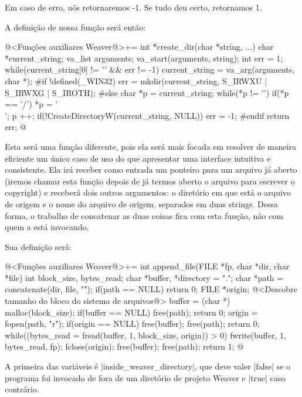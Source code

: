{Em caso de erro, nós retornaremos -1. Se tudo deu certo, retornamos 1.

A definição de nossa função será então:

\iniciocodigo
@<Funções auxiliares Weaver@>+=
int *create_dir(char *string, ...){
  char *current_string;
  va_list arguments;
  va_start(arguments, string);
  int err = 1;
  while(current_string[0] != '\0' && err != -1){
    current_string = va_arg(arguments, char *);
#if !defined(_WIN32)
    err = mkdir(current_string, S_IRWXU | S_IRWXG | S_IROTH);
#else
    {
      char *p = current_string;
      while(*p != '\0'){
        if(*p == '/') *p = '\\';
        p ++;
      }
      if(!CreateDirectoryW(current_string, NULL))
        err = -1;
    }
#endif
  }
  return err;
}
@
\fimcodigo


Esta será uma função diferente, pois ela será mais focada em resolver
de maneira eficiente um único caso de uso do que apresentar uma
interface intuitiva e consistente. Ela irá receber como entrada um
ponteiro para um arquivo já aberto (iremos chamar esta função depois
de já termos aberto o arquivo para escrever o copyright) e receberá
dois outros argumentos: o diretório em que está o arquivo de origem e
o nome do arquivo de origem, separados em duas strings. Dessa forma, o
trabalho de concatenar as duas coisas fica com esta função, não com
quem a está invocando.

Sua definição será:

\iniciocodigo
@<Funções auxiliares Weaver@>+=
int append_file(FILE *fp, char *dir, char *file){
  int block_size, bytes_read;
  char *buffer, *directory = ".";
  char *path = concatenate(dir, file, "");
  if(path == NULL) return 0;
  FILE *origin;
  @<Descobre tamanho do bloco do sistema de arquivos@>
  buffer = (char *) malloc(block_size);
  if(buffer == NULL){
    free(path);
    return 0;
  }
  origin = fopen(path, "r");
  if(origin == NULL){
    free(buffer);
    free(path);
    return 0;
  }
  while((bytes_read = fread(buffer, 1, block_size, origin)) > 0){
    fwrite(buffer, 1, bytes_read, fp);
  }
  fclose(origin);
  free(buffer);
  free(path);
  return 1;
}
@
\fimcodigo



A primeira das variáveis é |inside_weaver_directory|, que deve valer
|false| se o programa foi invocado de fora de um diretório de projeto
Weaver e |true| caso contrário.

}
